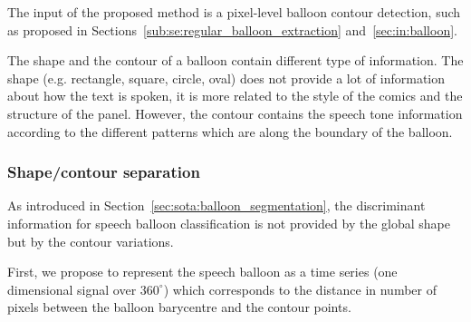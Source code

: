 



The input of the proposed method is a pixel-level balloon contour detection, such as proposed in Sections~\ref{sub:se:regular_balloon_extraction} and~\ref{sec:in:balloon}.

The shape and the contour of a balloon contain different type of information.
The shape (e.g. rectangle, square, circle, oval) does not provide a lot of information about how the text is spoken, it is more related to the style of the comics and the structure of the panel.
However, the contour contains the speech tone information according to the different patterns which are along the boundary of the balloon.




\subsubsection{Shape/contour separation}
\label{sec:contour_detection}
As introduced in Section~\ref{sec:sota:balloon_segmentation}, the discriminant information for speech balloon classification is not provided by the global shape but by the contour variations. 

First, we propose to represent the speech balloon as a time series (one dimensional signal over $360^\circ$) which corresponds to the distance in number of pixels between the balloon barycentre and the contour points. 

